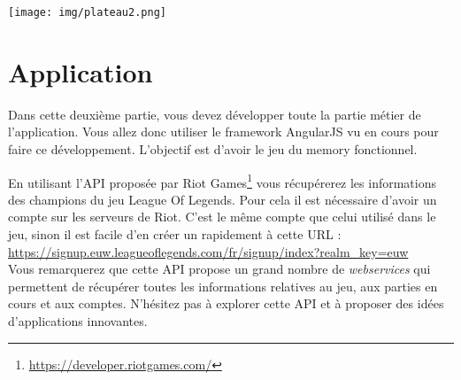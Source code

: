 \documentclass[a4paper,11pt]{article}
\theoremstyle{mytheor}
\begin{document}
\texttt{[image: img/plateau2.png]}

\section{Application}
Dans cette deuxième partie, vous devez développer toute la partie métier de l'application. Vous allez donc utiliser le framework AngularJS vu en cours pour faire ce développement. L'objectif est d'avoir le jeu du memory fonctionnel.

En utilisant l'API proposée par Riot Games\textsuperscript{\texttrademark}\footnote{\url{https://developer.riotgames.com/}} vous récupérerez les informations des champions du jeu League Of Legends. Pour cela il est nécessaire d'avoir un compte sur les serveurs de Riot. C'est le même compte que celui utilisé dans le jeu, sinon il est facile d'en créer un rapidement à cette URL : \\ \url{https://signup.euw.leagueoflegends.com/fr/signup/index?realm_key=euw} \\ Vous remarquerez que cette API propose un grand nombre de \textit{webservices} qui permettent de récupérer toutes les informations relatives au jeu, aux parties en cours et aux comptes. N'hésitez pas à explorer cette API et à proposer des idées d'applications innovantes.
\end{document}
